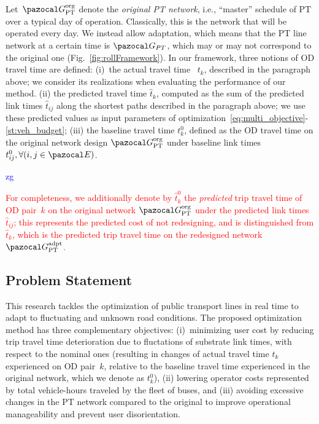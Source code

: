 \documentclass[a4paper,fleqn]{cas-sc}
\newcommand{\stkout}[1]{\ifmmode\text{\sout{\ensuremath{#1}}}\else\sout{#1}\fi}
\newcommand\rev[3]{\textcolor{blue}{\begin{scriptsize}{#1}\end{scriptsize}\stkout{#2}}\textcolor{red}{#3}}
\newcommand\rev[3]{\ignorespaces#3\ignorespaces\unskip}
\begin{document}
Let~$\pazocal G_\text{PT}^\text{org}$ denote the \emph{original PT network}, i.e., ``master'' schedule of PT over a typical day of operation. Classically, this is the network that will be operated every day. We instead allow adaptation, which means that the PT line network at a certain time is $\pazocal G_{PT}$, which may or may not correspond to the original one (Fig.~\ref{fig:rollFramework}).
%
In our framework, three notions of OD travel time are defined:
(i)~the actual travel time ~$t_k$, described in the paragraph above; we consider its realizations when evaluating the performance of our method.
(ii) the predicted travel time $\hat t_k$, computed as the sum of the predicted link times $\hat t_{ij}$ along the shortest paths described in the paragraph above; we use these predicted values as input parameters of optimization~\eqref{eq:multi_objective}-\eqref{st:veh_budget};
(iii) the baseline travel time $t_k^0$, defined as the OD travel time on the original network design $\pazocal G_\text{PT}^\text{org}$ under baseline link times $t_{ij}^0,\forall (i,j\in\pazocal E)$.
\rev{zg}{}{For completeness, we additionally denote by $\hat t_k^0$ the \emph{predicted} trip travel time of OD pair~$k$ on the original network $\pazocal G_\text{PT}^\text{org}$ under the predicted link times $\hat t_{ij}$; this represents the predicted cost of not redesigning, and is distinguished from $\hat t_k$, which is the predicted trip travel time on the redesigned network $\pazocal G_\text{PT}^\text{adpt}$.}
\subsection{Problem Statement}\label{sec:problemStatement}
This research tackles the optimization of public transport lines in real time to adapt to fluctuating and unknown road conditions.
%
The proposed optimization method has three complementary objectives: 
(i)~minimizing user cost by reducing trip travel time deterioration due to fluctations of substrate link times, with respect to the nominal ones (resulting in changes of actual travel time $t_k$ experienced on OD pair~$k$, relative to the baseline travel time experienced in the original network, which we denote as $t_k^0$), 
(ii) lowering operator costs represented by total vehicle-hours traveled by the fleet of buses, and (iii) avoiding excessive changes in the PT network compared to the original to improve operational manageability and prevent user disorientation.
\end{document}
